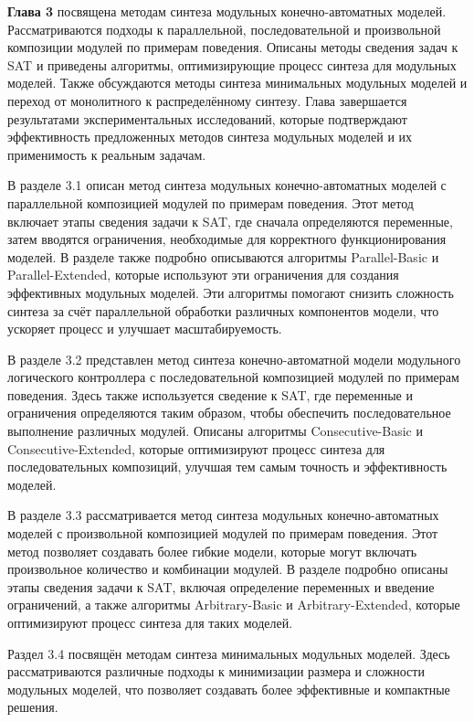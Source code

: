 \textbf{Глава 3} посвящена методам синтеза модульных конечно-автоматных моделей. Рассматриваются подходы к параллельной, последовательной и произвольной композиции модулей по примерам поведения. Описаны методы сведения задач к SAT и приведены алгоритмы, оптимизирующие процесс синтеза для модульных моделей. Также обсуждаются методы синтеза минимальных модульных моделей и переход от монолитного к распределённому синтезу. Глава завершается результатами экспериментальных исследований, которые подтверждают эффективность предложенных методов синтеза модульных моделей и их применимость к реальным задачам.

В разделе 3.1 описан метод синтеза модульных конечно-автоматных моделей с параллельной композицией модулей по примерам поведения. Этот метод включает этапы сведения задачи к SAT, где сначала определяются переменные, затем вводятся ограничения, необходимые для корректного функционирования моделей. В разделе также подробно описываются алгоритмы Parallel-Basic и Parallel-Extended, которые используют эти ограничения для создания эффективных модульных моделей. Эти алгоритмы помогают снизить сложность синтеза за счёт параллельной обработки различных компонентов модели, что ускоряет процесс и улучшает масштабируемость.

В разделе 3.2 представлен метод синтеза конечно-автоматной модели модульного логического контроллера с последовательной композицией модулей по примерам поведения. Здесь также используется сведение к SAT, где переменные и ограничения определяются таким образом, чтобы обеспечить последовательное выполнение различных модулей. Описаны алгоритмы Consecutive-Basic и Consecutive-Extended, которые оптимизируют процесс синтеза для последовательных композиций, улучшая тем самым точность и эффективность моделей.

В разделе 3.3 рассматривается метод синтеза модульных конечно-автоматных моделей с произвольной композицией модулей по примерам поведения. Этот метод позволяет создавать более гибкие модели, которые могут включать произвольное количество и комбинации модулей. В разделе подробно описаны этапы сведения задачи к SAT, включая определение переменных и введение ограничений, а также алгоритмы Arbitrary-Basic и Arbitrary-Extended, которые оптимизируют процесс синтеза для таких моделей.

Раздел 3.4 посвящён методам синтеза минимальных модульных моделей. Здесь рассматриваются различные подходы к минимизации размера и сложности модульных моделей, что позволяет создавать более эффективные и компактные решения.

